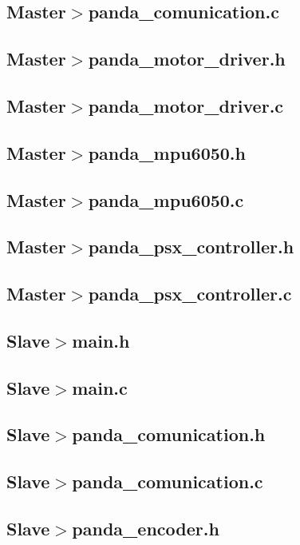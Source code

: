 \documentclass{article}
\begin{document}
    \subsection{Master$>$panda\_comunication.c}

    \subsection{Master$>$panda\_motor\_driver.h}
    \subsection{Master$>$panda\_motor\_driver.c}

    \subsection{Master$>$panda\_mpu6050.h}
    \subsection{Master$>$panda\_mpu6050.c}

    \subsection{Master$>$panda\_psx\_controller.h}
    \subsection{Master$>$panda\_psx\_controller.c}

    \subsection{Slave$>$main.h}
    \subsection{Slave$>$main.c}

    \subsection{Slave$>$panda\_comunication.h}
    \subsection{Slave$>$panda\_comunication.c}

    \subsection{Slave$>$panda\_encoder.h}
\end{document}

